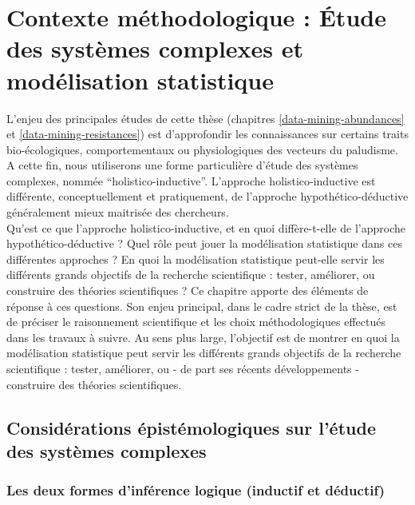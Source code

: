 \documentclass[12pt,twoside]{reedthesis}
\begin{document}
\hypertarget{data-mining}{%
\chapter{Contexte méthodologique : Étude des systèmes complexes et modélisation statistique}\label{data-mining}}

L'enjeu des principales études de cette thèse (chapitres \ref{data-mining-abundances} et \ref{data-mining-resistances}) est d'approfondir les connaissances sur certains traits bio-écologiques, comportementaux ou physiologiques des vecteurs du paludisme. A cette fin, nous utiliserons une forme particulière d'étude des systèmes complexes, nommée ``holistico-inductive''. L'approche holistico-inductive est différente, conceptuellement et pratiquement, de l'approche hypothético-déductive généralement mieux maitrisée des chercheurs.\\

Qu'est ce que l'approche holistico-inductive, et en quoi diffère-t-elle de l'approche hypothético-déductive ? Quel rôle peut jouer la modélisation statistique dans ces différentes approches ? En quoi la modélisation statistique peut-elle servir les différents grands objectifs de la recherche scientifique : tester, améliorer, ou construire des théories scientifiques ? Ce chapitre apporte des éléments de réponse à ces questions. Son enjeu principal, dans le cadre strict de la thèse, est de préciser le raisonnement scientifique et les choix méthodologiques effectués dans les travaux à suivre. Au sens plus large, l'objectif est de montrer en quoi la modélisation statistique peut servir les différents grands objectifs de la recherche scientifique : tester, améliorer, ou - de part ses récents développements - construire des théories scientifiques.

\hypertarget{studying-complex-systems}{%
\section{Considérations épistémologiques sur l'étude des systèmes complexes}\label{studying-complex-systems}}

\hypertarget{les-deux-formes-dinfuxe9rence-logique-inductif-et-duxe9ductif}{%
\subsection{Les deux formes d'inférence logique (inductif et déductif)}\label{les-deux-formes-dinfuxe9rence-logique-inductif-et-duxe9ductif}}
\end{document}
